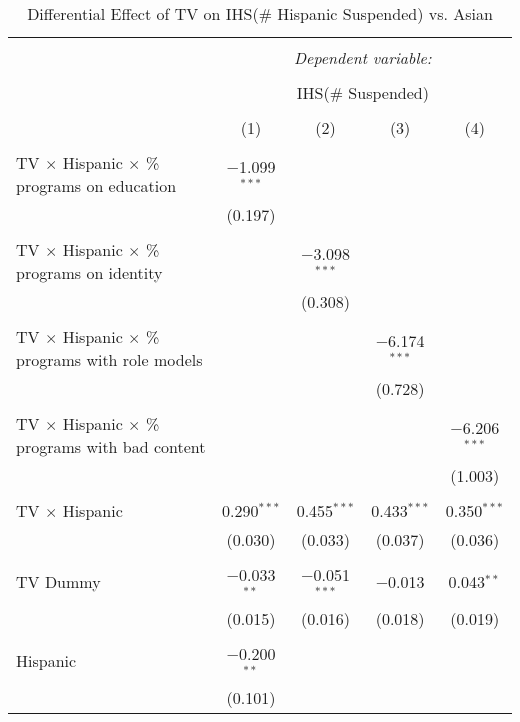 
\begin{table}[!htbp] \centering 
  \caption{Differential Effect of TV on IHS(\# Hispanic Suspended) vs. Asian} 
  \label{} 
\begin{tabular}{@{\extracolsep{-2pt}}lcccc} 
\\[-1.8ex]\hline 
\hline \\[-1.8ex] 
 & \multicolumn{4}{c}{\textit{Dependent variable:}} \\ 
\cline{2-5} 
\\[-1.8ex] & \multicolumn{4}{c}{IHS(\# Suspended)} \\ 
\\[-1.8ex] & (1) & (2) & (3) & (4)\\ 
\hline \\[-1.8ex] 
 TV $\times$ Hispanic $\times$ \% programs on education & $-$1.099$^{***}$ &  &  &  \\ 
  & (0.197) &  &  &  \\ 
  & & & & \\ 
 TV $\times$ Hispanic $\times$ \% programs on identity &  & $-$3.098$^{***}$ &  &  \\ 
  &  & (0.308) &  &  \\ 
  & & & & \\ 
 TV $\times$ Hispanic $\times$ \% programs with role models &  &  & $-$6.174$^{***}$ &  \\ 
  &  &  & (0.728) &  \\ 
  & & & & \\ 
 TV $\times$ Hispanic $\times$ \% programs with bad content &  &  &  & $-$6.206$^{***}$ \\ 
  &  &  &  & (1.003) \\ 
  & & & & \\ 
 TV $\times$ Hispanic & 0.290$^{***}$ & 0.455$^{***}$ & 0.433$^{***}$ & 0.350$^{***}$ \\ 
  & (0.030) & (0.033) & (0.037) & (0.036) \\ 
  & & & & \\ 
 TV Dummy & $-$0.033$^{**}$ & $-$0.051$^{***}$ & $-$0.013 & 0.043$^{**}$ \\ 
  & (0.015) & (0.016) & (0.018) & (0.019) \\ 
  & & & & \\ 
 Hispanic & $-$0.200$^{**}$ &  &  &  \\ 
  & (0.101) &  &  &  \\ 

\end{tabular}
\end{table}
